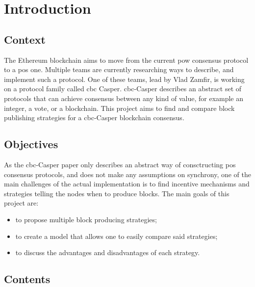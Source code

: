 \chapter{Introduction}
\label{chap:introduction}

\section{Context}

The Ethereum blockchain aims to move from the current \gls{pow} consensus
protocol to a \gls{pos} one. Multiple teams are currently researching ways to
describe, and implement such a protocol. One of these teams, lead by Vlad
Zamfir, is working on a protocol family called \gls{cbc} Casper.
\gls{cbc}-Casper describes an abstract set of protocols that can achieve
consensus between any kind of value, for example an integer, a vote, or a
blockchain. This project aims to find and compare block publishing strategies
for a \gls{cbc}-Casper blockchain consensus.

\section{Objectives}
As the \gls{cbc}-Casper paper only describes an abstract way of consctructing
\gls{pos} consensus protocols, and does not make any assumptions on synchrony,
one of the main challenges of the actual implementation is to find incentive
mechanisms and strategies telling the nodes when to produce blocks.  The main
goals of this project are:

\begin{itemize}
        \item to propose multiple block producing strategies;
        \item to create a model that allows one to easily compare said strategies;
        \item to discuss the advantages and disadvantages of each strategy.
\end{itemize}

\section{Contents}


